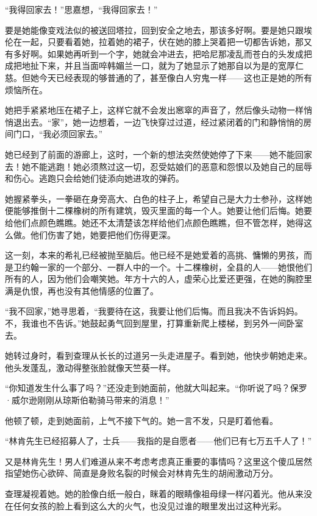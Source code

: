 \par “我得回家去！”思嘉想，“我得回家去！”
\par 要是她能像变戏法似的被送回塔拉，回到安全之地去，那该多好啊。要是她只跟埃伦在一起，只要看着她，拉着她的裙子，伏在她的膝上哭着把一切都告诉她，那又有多好啊。如果她再听到一个字，她就会冲进去，把哈尼那凌乱而苍白的头发成把成把地扯下来，并且当面啐韩媚兰一口，就为了她显示了她那自以为是的宽厚仁慈。但她今天已经表现的够普通的了，甚至像白人穷鬼一样——这也正是她的所有烦恼所在。
\par 她把手紧紧地压在裙子上，这样它就不会发出窸窣的声音了，然后像头动物一样悄悄退出去。“家”，她一边想着，一边飞快穿过过道，经过紧闭着的门和静悄悄的房间门口，“我必须回家去。”
\par 她已经到了前面的游廊上，这时，一个新的想法突然使她停了下来——她不能回家去！她不能逃跑！她必须熬过这一切，忍受姑娘们的恶意和怨恨以及她自己的屈辱和伤心。逃跑只会给她们徒添向她进攻的弹药。
\par 她握紧拳头，一拳砸在身旁高大、白色的柱子上，希望自己是大力士参孙，这样她便能够推倒十二棵橡树的所有建筑，毁灭里面的每一个人。她要让他们后悔。她要给他们点颜色瞧瞧。她还不太清楚该怎样给他们点颜色瞧瞧，但不管怎样，她得这么做。他们伤害了她，她要把他们伤得更深。
\par 这一刻，本来的希礼已经被抛至脑后。他已经不是她爱着的高挑、慵懒的男孩，而是卫约翰一家的一个部分、一群人中的一个。十二棵橡树，全县的人——她恨他们所有的人，因为他们会嘲笑她。年方十六的人，虚荣心比爱还更强，在她的胸腔里满是仇恨，再也没有其他情感的位置了。
\par “我不回家，”她寻思着，“我要待在这，我要让他们后悔。而且我决不告诉妈妈。不，我谁也不告诉。”她鼓起勇气回到屋里，打算重新爬上楼梯，到另外一间卧室去。
\par 她转过身时，看到查理从长长的过道另一头走进屋子。看到她，他快步朝她走来。他头发蓬乱，激动得整张脸就像天竺葵一样。
\par “你知道发生什么事了吗？”还没走到她面前，他就大叫起来。“你听说了吗？保罗·威尔逊刚刚从琼斯伯勒骑马带来的消息！”
\par 他顿了顿，走到她面前，上气不接下气的。她一言不发，只是盯着他看。
\par “林肯先生已经招募人了，士兵——我指的是自愿者——他们已有七万五千人了！”
\par 又是林肯先生！男人们难道从来不考虑考虑真正重要的事情吗？这里这个傻瓜居然指望她伤心欲碎、简直是身败名裂的时候会对林肯先生的胡闹激动万分。
\par 查理凝视着她。她的脸像白纸一般白，眯着的眼睛像祖母绿一样闪着光。他从来没在任何女孩的脸上看到这么大的火气，也没见过谁的眼里发出过这种光彩。
